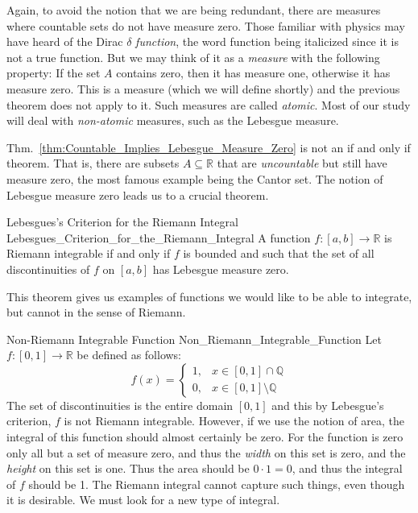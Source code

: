 \documentclass[crop=false,class=article]{standalone}                           %
\begin{document}
        Again, to avoid the notion that we are being redundant, there are
        measures where countable sets do not have measure zero. Those
        familiar with physics may have heard of the Dirac
        $\delta$ \textit{function}, the word function being italicized since
        it is not a true function. But we may think of it as a
        \textit{measure} with the following property: If the set $A$ contains
        zero, then it has measure one, otherwise it has measure zero. This
        is a measure (which we will define shortly) and the previous theorem
        does not apply to it. Such measures are called \textit{atomic}.
        Most of our study will deal with \textit{non-atomic} measures, such
        as the Lebesgue measure.
        \par\hfill\par
        Thm.~\ref{thm:Countable_Implies_Lebesgue_Measure_Zero} is not an
        if and only if theorem. That is, there are subsets
        $A\subseteq\mathbb{R}$ that are \textit{uncountable} but still have
        measure zero, the most famous example being the Cantor set. The
        notion of Lebesgue measure zero leads us to a crucial theorem.
        \begin{ltheorem}{Lebesgues's Criterion for the Riemann Integral}
                        {Lebesgues_Criterion_for_the_Riemann_Integral}
            A function $f:[a,b]\rightarrow\mathbb{R}$ is Riemann integrable
            if and only if $f$ is bounded and such that the set of all
            discontinuities of $f$ on $[a,b]$ has Lebesgue measure zero.
        \end{ltheorem}
        This theorem gives us examples of functions we would like to be
        able to integrate, but cannot in the sense of Riemann.
        \begin{lexample}{Non-Riemann Integrable Function}
                        {Non_Riemann_Integrable_Function}
            Let $f:[0,1]\rightarrow\mathbb{R}$ be defined as follows:
            \begin{equation}
                f(x)=
                \begin{cases}
                    1,&x\in[0,1]\cap\mathbb{Q}\\
                    0,&x\in[0,1]\setminus\mathbb{Q}
                \end{cases}
            \end{equation}
            The set of discontinuities is the entire domain $[0,1]$ and
            this by Lebesgue's criterion, $f$ is not Riemann integrable.
            However, if we use the notion of area, the integral of this
            function should almost certainly be zero. For the function is
            zero only all but a set of measure zero, and thus the
            \textit{width} on this set is zero, and the \textit{height} on
            this set is one. Thus the area should be $0\cdot{1}=0$, and thus
            the integral of $f$ should be 1. The Riemann integral cannot
            capture such things, even though it is desirable. We must look
            for a new type of integral.
        \end{lexample}
\end{document}

